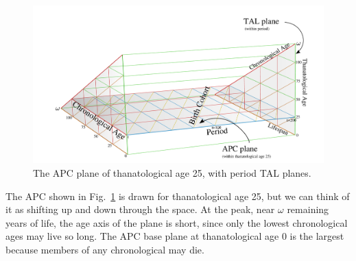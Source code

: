 \documentclass[11pt,oneside,a4paper]{article} %
\begin{document}
\begin{figure}[!h]
\centering
\begin{adjustwidth}{-6em}{-6em}
\caption[cap]{The APC plane of thanatological age 25, with period TAL planes.}
\label{fig:apctAPC}
\includegraphics[scale=.5]{Figures/APCisomarkedup.pdf}
\end{adjustwidth}
\end{figure}

The APC shown in Fig.~\ref{fig:apctAPC} is drawn for thanatological age 25,
but we can think of it as shifting up and down through the space.
At the peak, near $\omega$ remaining years of life, the age axis of the plane is short, since
only the lowest chronological ages may live so long. The APC base plane at
thanatological age 0 is the largest because members of any chronological may
die.
\FloatBarrier

   
\end{document}
